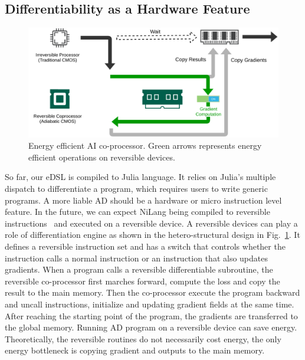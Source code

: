 \documentclass{article}
\newcommand{\<}{\langle}
\renewcommand{\>}{\rangle}
\newcommand{\Fig}[1]{Fig.~\ref{#1}}
\theoremstyle{definition}\newtheorem{definition}{\textit{Definition}}
\begin{document}
\subsection{Differentiability as a Hardware Feature}\label{sec:hardware}

\begin{figure}
    \centerline{\includegraphics[width=0.8\columnwidth,trim={0 0cm 0 0cm},clip]{hardware.pdf}}
    \caption{Energy efficient AI co-processor. Green arrows represents energy efficient operations on reversible devices.}\label{fig:hardware}
\end{figure}
So far, our eDSL is compiled to Julia language. It relies on Julia's multiple dispatch to differentiate a program, which requires users to write generic programs.
A more liable AD should be a hardware or micro instruction level feature.
In the future, we can expect NiLang being compiled to reversible instructions~\cite{Vieri1999} and executed on a reversible device.
A reversible devices can play a role of differentiation engine as shown in the hetero-structural design in \Fig{fig:hardware}.
It defines a reversible instruction set and has a switch that controls whether the instruction calls a normal instruction or an instruction that also updates gradients.
When a program calls a reversible differentiable subroutine, the reversible co-processor first marches forward, compute the loss and copy the result to the main memory.
Then the co-processor execute the program backward and uncall instructions, initialize and updating gradient fields at the same time.
After reaching the starting point of the program, the gradients are transferred to the global memory.
Running AD program on a reversible device can save energy. Theoretically, the reversible routines do not necessarily cost energy, the only energy bottleneck is copying gradient and outputs to the main memory.
\end{document}
